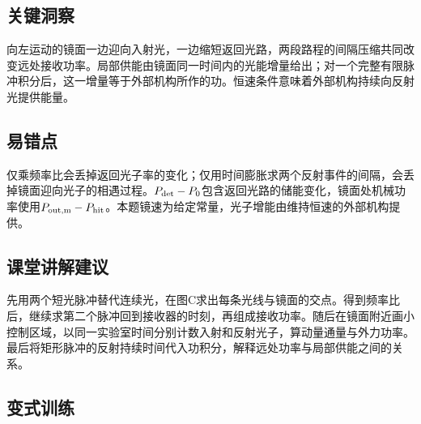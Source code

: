 \documentclass[UTF8,fontset=fandol,a4paper,11pt]{ctexart}
\begin{document}


\subsection*{关键洞察}

向左运动的镜面一边迎向入射光，一边缩短返回光路，两段路程的间隔压缩共同改变远处接收功率。局部供能由镜面同一时间内的光能增量给出；对一个完整有限脉冲积分后，这一增量等于外部机构所作的功。恒速条件意味着外部机构持续向反射光提供能量。



\subsection*{易错点}

仅乘频率比会丢掉返回光子率的变化；仅用时间膨胀求两个反射事件的间隔，会丢掉镜面迎向光子的相遇过程。$P_{\rm det}-P_0$包含返回光路的储能变化，镜面处机械功率使用$P_{\rm out,m}-P_{\rm hit}$。本题镜速为给定常量，光子增能由维持恒速的外部机构提供。



\subsection*{课堂讲解建议}

先用两个短光脉冲替代连续光，在图C求出每条光线与镜面的交点。得到频率比后，继续求第二个脉冲回到接收器的时刻，再组成接收功率。随后在镜面附近画小控制区域，以同一实验室时间分别计数入射和反射光子，算动量通量与外力功率。最后将矩形脉冲的反射持续时间代入功积分，解释远处功率与局部供能之间的关系。



\subsection*{变式训练}
\end{document}
